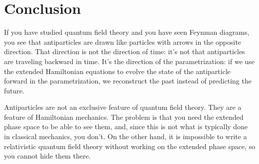 \documentclass[aps,pra,10pt,floatfix,nofootinbib]{revtex4-1}
\theoremstyle{definition}
\begin{document}
\section{Conclusion}

If you have studied quantum field theory and you have seen Feynman diagrams, you see that antiparticles are drawn like particles with arrows in the opposite direction. That direction is not the direction of time: it's not that antiparticles are traveling backward in time. It's the direction of the parametrization: if we use the extended Hamiltonian equations to evolve the state of the antiparticle forward in the parametrization, we reconstruct the past instead of predicting the future.

Antiparticles are not an exclusive feature of quantum field theory. They are a feature of Hamiltonian mechanics. The problem is that you need the extended phase space to be able to see them, and, since this is not what is typically done in classical mechanics, you don't. On the other hand, it is impossible to write a relativistic quantum field theory without working on the extended phase space, so you cannot hide them there.
\end{document}
